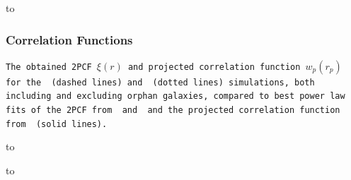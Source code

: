 {
    {\vbox to }
    \begin{frame}
        \frametitle{Correlation Functions}
        \vspace{6.5cm}
        \tiny\texttt{The obtained 2PCF $\xi(r)$ and projected correlation function $w_p(r_p)$ for the \gsmall\ (dashed lines) and \glarge\ (dotted lines) simulations, both including and excluding orphan galaxies, compared to best power law fits of the 2PCF from \cite{LiWhite} and \cite{Correlation1} and the projected correlation function  from \cite{LiWhite} (solid lines).
        }
    \end{frame}
}


{
    {\vbox to }
    \begin{frame}[plain]
    \end{frame}
}

{
    {\vbox to }
    \begin{frame}[plain]
    \end{frame}
}

